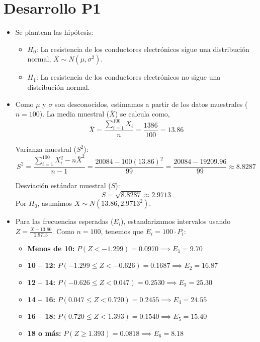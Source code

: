 \documentclass[12pt,a4paper]{article}
\begin{document}
\section*{Desarrollo P1}
\begin{itemize}
    \item [a)] Se plantean las hipótesis:
    \begin{itemize}
        \item $H_0$: La resistencia de los conductores electrónicos sigue una distribución normal, $X \sim N(\mu, \sigma^2)$.
        \item $H_1$: La resistencia de los conductores electrónicos no sigue una distribución normal.
    \end{itemize}

    \item [b)]
        Como $\mu$ y $\sigma$ son desconocidos, estimamos a partir de los datos muestrales ($n = 100$).
        La media muestral ($\bar{X}$) se calcula como,
        \begin{equation*}
            \bar{X} = \frac{\sum_{i=1}^{100} X_i}{n} = \frac{1386}{100} = 13.86
        \end{equation*}
        
        Varianza muestral ($S^2$):
        \begin{equation*}
            S^2 = \frac{\sum_{i=1}^{100} X_{i}^{2} - n\bar{X}^2}{n - 1} = \frac{20084 - 100(13.86)^2}{99} = \frac{20084 - 19209.96}{99} \approx 8.8287
        \end{equation*}
        
        Desviación estándar muestral ($S$):
        \begin{equation*}
            S = \sqrt{8.8287} \approx 2.9713
        \end{equation*}
        Por $H_0$, asumimos $X \sim N(13.86, 2.9713^2)$.

\item [c)] 
        Para las frecuencias esperadas ($E_i$), estandarizamos intervalos usando $Z = \frac{X - 13.86}{2.9713}$. Como $n=100$, tenemos que $E_i = 100 \cdot P_i$:
        
        \begin{itemize}
            \item \textbf{Menos de 10:} $P(Z < -1.299) = 0.0970 \implies E_1 = 9.70$
            \item \textbf{10 -- 12:} $P(-1.299 \leq Z < -0.626) = 0.1687 \implies E_2 = 16.87$
            \item \textbf{12 -- 14:} $P(-0.626 \leq Z < 0.047) = 0.2530 \implies E_3 = 25.30$
            \item \textbf{14 -- 16:} $P(0.047 \leq Z < 0.720) = 0.2455 \implies E_4 = 24.55$
            \item \textbf{16 -- 18:} $P(0.720 \leq Z < 1.393) = 0.1540 \implies E_5 = 15.40$
            \item \textbf{18 o más:} $P(Z \geq 1.393) = 0.0818 \implies E_6 = 8.18$
        \end{itemize}


\end{itemize}
\end{document}
